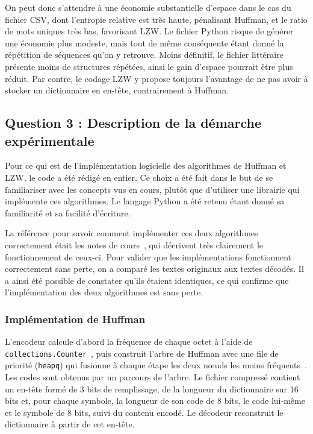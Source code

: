 \documentclass[12pt,letterpaper]{article}
\begin{document}
On peut donc s'attendre à une économie substantielle d'espace dans le cas du fichier CSV, dont l'entropie relative est très haute, pénalisant Huffman, et le ratio de mots uniques très bas, favorisant LZW.
Le fichier Python risque de générer une économie plus modeste, mais tout de même conséquente étant donné la répétition de séquences qu'on y retrouve.
Moins définitif, le fichier littéraire présente moins de structures répétées, ainsi le gain d'espace pourrait être plus réduit.
Par contre, le codage LZW y propose toujours l'avantage de ne pas avoir à stocker un dictionnaire en en-tête, contrairement à Huffman.

\subsection{Question 3 : Description de la démarche expérimentale}
\label{subsec:q3}

Pour ce qui est de l'implémentation logicielle des algorithmes de Huffman et LZW, le code a été rédigé en entier. 
Ce choix a été fait dans le but de se familiariser avec les concepts vus en cours, plutôt que d'utiliser une librairie qui implémente ces algorithmes. 
Le langage Python a été retenu étant donné sa familiarité et sa facilité d'écriture.

La référence pour savoir comment implémenter ces deux algorithmes correctement était les notes de cours~\cite{notesCours}, qui décrivent très clairement le fonctionnement de ceux-ci.
Pour valider que les implémentations fonctionnent correctement sans perte, on a comparé les textes originaux aux textes décodés. 
Il a ainsi été possible de constater qu'ils étaient identiques, ce qui confirme que l'implémentation des deux algorithmes est sans perte.

\subsubsection*{Implémentation de Huffman}

L'encodeur calcule d'abord la fréquence de chaque octet à l'aide de \texttt{collections.Counter}~\cite{python313}, puis construit l'arbre de Huffman avec une file de priorité (\texttt{heapq}) qui fusionne à chaque étape les deux nœuds les moins fréquents~\cite{huffman1952}.
Les codes sont obtenus par un parcours de l'arbre.
Le fichier compressé contient un en-tête formé de 3 bits de remplissage, de la longueur du dictionnaire sur 16 bits et, pour chaque symbole, la longueur de son code de 8 bits, le code lui-même et le symbole de 8 bits, suivi du contenu encodé.
Le décodeur reconstruit le dictionnaire à partir de cet en-tête.
\end{document}
